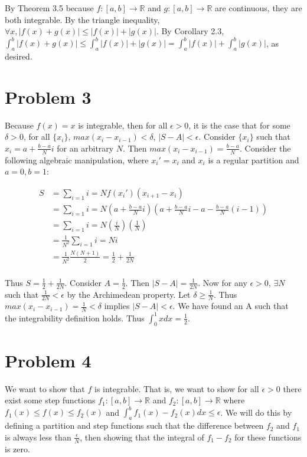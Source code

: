 \documentclass[10pt]{article} %
\begin{document}
By Theorem 3.5 because $f:[a,b]\rightarrow\mathbb{R}$ and $g:[a,b]\rightarrow\mathbb{R}$ are continuous, they are both integrable. By the triangle inequality, $\forall x, |f(x) + g(x)| \leq |f(x)| + |g(x)|$. By Corollary 2.3, $\int_a^b |f(x)+g(x)| \leq \int_a^b |f(x)|+|g(x)| = \int_a^b |f(x)| + \int_a^b |g(x)|$, as desired.\\

\section{Problem 3}
Because $f(x) = x$ is integrable, then for all $\epsilon > 0$, it is the case that for some $\delta > 0$, for all $\{x_i\}$, $max(x_i-x_{i-1})<\delta$, $|S - A| < \epsilon$. Consider $\{x_i\}$ such that $x_i = a + \frac{b-a}{N}i$ for an arbitrary $N$. Then $max(x_i-x_{i-1}) = \frac{b-a}{N}$. Consider the following algebraic manipulation, where $x_i' = x_i$ and $x_i$ is a regular partition and $a=0, b=1$:

\begin{align*}
  S &= \sum_{i=1}{i=N}f(x_i')(x_{i+1}-x_i)\\
  &= \sum_{i=1}{i=N}\left(a+\frac{b-a}{N}i\right)\left(a+\frac{b-a}{N}i - a -\frac{b-a}{N}(i-1)\right)\\
  &= \sum_{i=1}{i=N}\left(\frac{i}{N}\right)\left(\frac{1}{N}\right)\\
  &= \frac{1}{N^2}\sum_{i=1}{i=N}i\\
  &= \frac{1}{N^2}\frac{N(N+1)}{2} = \frac{1}{2} + \frac{1}{2N}\\
\end{align*}

Thus $S = \frac{1}{2} + \frac{1}{2N}$. Consider $A=\frac{1}{2}$. Then $|S - A| = \frac{1}{2N}$. Now for any $\epsilon > 0$, $\exists N$ such that $\frac{1}{2N} < \epsilon$ by the Archimedean property. Let $\delta \geq \frac{1}{N}$. Thus $max(x_i-x_{i-1}) = \frac{1}{N} < \delta$ implies $|S-A| < \epsilon$. We have found an A such that the integrability definition holds. Thus $\int_0^1xdx = \frac{1}{2}$.\\

\section{Problem 4}
We want to show that $f$ is integrable. That is, we want to show for all $\epsilon>0$ there exist some step functions $f_1:[a,b]\rightarrow\mathbb{R}$ and $f_2:[a,b]\rightarrow\mathbb{R}$ where $f_1(x) \leq f(x) \leq f_2(x)$ and $\int_a^b f_1(x) - f_2(x)dx \leq \epsilon$. We will do this by defining a partition and step functions such that the difference between $f_2$ and $f_1$ is always less than $\frac{\epsilon}{N}$, then showing that the integral of $f_1-f_2$ for these functions is zero.\\
\end{document}
